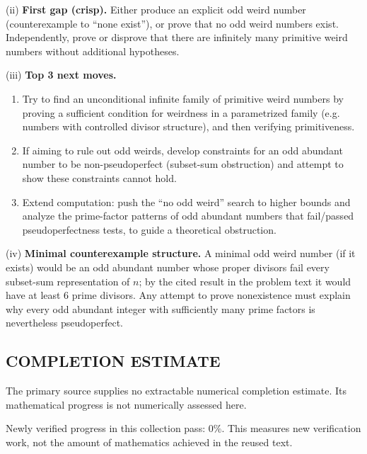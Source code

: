 (ii) \textbf{First gap (crisp).}
Either produce an explicit odd weird number (counterexample to ``none exist''), or prove that no odd weird numbers exist. Independently, prove or disprove that there are infinitely many primitive weird numbers without additional hypotheses.

(iii) \textbf{Top 3 next moves.}
\begin{enumerate}
\item Try to find an unconditional infinite family of primitive weird numbers by proving a sufficient condition for weirdness in a parametrized family (e.g. numbers with controlled divisor structure), and then verifying primitiveness.
\item If aiming to rule out odd weirds, develop constraints for an odd abundant number to be non-pseudoperfect (subset-sum obstruction) and attempt to show these constraints cannot hold.
\item Extend computation: push the ``no odd weird'' search to higher bounds and analyze the prime-factor patterns of odd abundant numbers that fail/passed pseudoperfectness tests, to guide a theoretical obstruction.
\end{enumerate}

(iv) \textbf{Minimal counterexample structure.}
A minimal odd weird number (if it exists) would be an odd abundant number whose proper divisors fail every subset-sum representation of $n$; by the cited result in the problem text it would have at least 6 prime divisors. Any attempt to prove nonexistence must explain why every odd abundant integer with sufficiently many prime factors is nevertheless pseudoperfect.


\subsection*{COMPLETION ESTIMATE}
The primary source supplies no extractable numerical completion estimate. Its mathematical progress is not numerically assessed here.

Newly verified progress in this collection pass: $0\%$. This measures new verification work, not the amount of mathematics achieved in the reused text.

